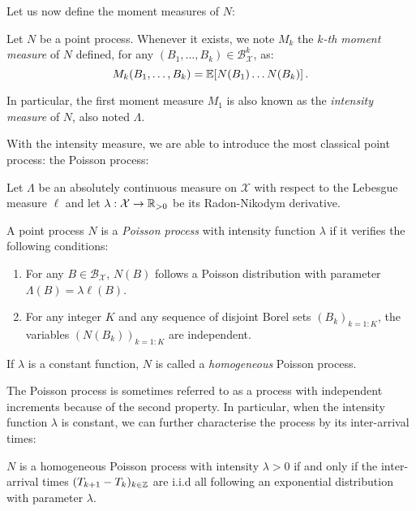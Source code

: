 Let us now define the moment measures of $N$:
\begin{definition}
    Let $N$ be a point process. Whenever it exists, we note $M_k$ the \emph{$k$-th moment measure} of $N$ defined, for any $(B_1,\ldots, B_k)\in\mathcal{B}_{\mathcal{X}}^k$, as:
    \[M_k(B_1, \ldots, B_k) = {\mathbb E}[N(B_1)\ldots N(B_k)]\,.\]

    In particular, the first moment measure $M_1$ is also known as the \emph{intensity measure} of $N$, also noted $\Lambda$.
\end{definition}
With the intensity measure, we are able to introduce the most classical point process: the Poisson process:

\begin{definition}\label{def:chap1_poisson_process}
    Let $\Lambda$ be an absolutely continuous measure on $\mathcal{X}$ with respect to the Lebesgue measure $\ell$ and let $\lambda:\mathcal{X}\to{\mathbb R}_{>0}$ be its Radon-Nikodym derivative.

    A point process $N$ is a \emph{Poisson process} with intensity function $\lambda$ if it verifies the following conditions:
    \begin{enumerate}
        \item For any $B\in\mathcal{B}_{\mathcal{X}}$, $N(B)$ follows a Poisson distribution with parameter $\Lambda(B) = \lambda \ell(B)$.
        \item For any integer $K$ and any sequence of disjoint Borel sets $(B_k)_{k=1:K}$, the variables $(N(B_k))_{k=1:K}$ are independent.
    \end{enumerate}

    If $\lambda$ is a constant function, $N$ is called a \emph{homogeneous} Poisson process.
\end{definition}
The Poisson process is sometimes referred to as a process with independent increments because of the second property.
In particular, when the intensity function $\lambda$ is constant, we can further characterise the process by its inter-arrival times:

\begin{theorem}{\parencite[Theorem 7.2]{Last2017}}\label{th:chap1_interarrival_exponential}

    $N$ is a homogeneous Poisson process with intensity $\lambda > 0$ if and only if the inter-arrival times $(T_{k+1} - T_k)_{k\in{\mathbb Z}}$ are i.i.d all following an exponential distribution with parameter $\lambda$.
\end{theorem}

